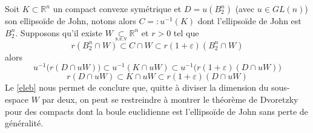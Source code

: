 \documentclass[12pt]{article}
\theoremstyle{definition}
\newcommand{\sev}{\underset{\text{s.e.v}}{\subset}}
\renewenvironment{leftbar}{%
	\def\FrameCommand{\vrule width 0.4pt \hspace{10pt}}%
	\MakeFramed {\advance\hsize-\width \FrameRestore}}%
{\endMakeFramed}
\begin{document}
\begin{leftbar}
\begin{rem}\label{rem0}
Soit $K\subset \mathbb{R}^n$ un compact convexe symétrique et $D=u(B_2^n)$ (avec $u\in GL(n)$) son ellipsoïde de John, notons alors $C=:u^{-1}(K)$ dont l'ellipsoïde de John est $B_2^n$. Supposons qu'il existe $W\sev \mathbb{R}^n$ et $r>0$ tel que
\begin{equation*}
r (B_2^n\cap W)\subset C\cap W \subset r(1+\varepsilon)(B_2^n\cap W)
\end{equation*}
alors 
\begin{equation*}
u^{-1}\big(r(D\cap uW)\big)\subset u^{-1}(K\cap uW)\subset u^{-1}\big(r(1+\varepsilon)(D\cap uW)\big)
\end{equation*}
\begin{equation*}
r(D\cap uW)\subset K\cap uW \subset r(1+\varepsilon)(D\cap uW)
\end{equation*}
Le \cref{eleb} nous permet de conclure que, quitte à diviser la dimension du sous-espace $W$ par deux, on peut se restreindre à montrer le théorème de Dvoretzky pour des compacts dont la boule euclidienne est l'ellipsoïde de John sans perte de généralité.
\end{rem}\end{leftbar}
\end{document}
